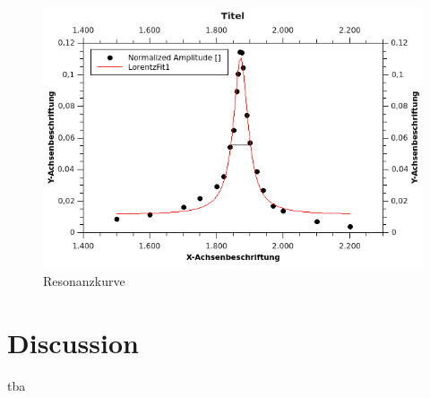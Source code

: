 \documentclass[12pt,a4paper]{article}
\begin{document}
\begin{multicols}{2}
\begin{figure}[H]
	\centering
	\includegraphics[scale=1.2]{../figures/Resonanzkurve.png}
	\caption{Resonanzkurve}
	\label{fig:resonanzkurve}
\end{figure}
\section{Discussion}
tba

\pagebreak




\end{multicols}
\end{document}
